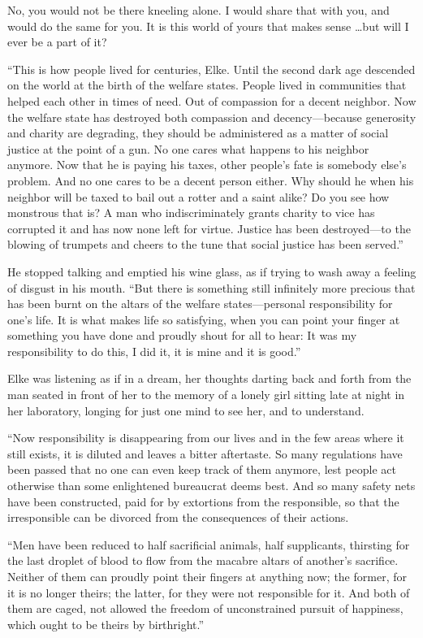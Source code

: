 No, you would not be there kneeling alone. I would share that with you, and would do the same for you. It is this world of yours that makes sense \ldots but will I ever be a part of it?

``This is how people lived for centuries, Elke. Until the second dark age descended on the world at the birth of the welfare states. People lived in communities that helped each other in times of need. Out of compassion for a decent neighbor. Now the welfare state has destroyed both compassion and decency---because generosity and charity are degrading, they should be administered as a matter of social justice at the point of a gun. No one cares what happens to his neighbor anymore. Now that he is paying his taxes, other people's fate is somebody else's problem. And no one cares to be a decent person either. Why should he when his neighbor will be taxed to bail out a rotter and a saint alike? Do you see how monstrous that is? A man who indiscriminately grants charity to vice has corrupted it and has now none left for virtue. Justice has been destroyed---to the blowing of trumpets and cheers to the tune that social justice has been served.''

He stopped talking and emptied his wine glass, as if trying to wash away a feeling of disgust in his mouth. ``But there is something still infinitely more precious that has been burnt on the altars of the welfare states---personal responsibility for one's life. It is what makes life so satisfying, when you can point your finger at something you have done and proudly shout for all to hear: It was my responsibility to do this, I did it, it is mine and it is good.''

Elke was listening as if in a dream, her thoughts darting back and forth from the man seated in front of her to the memory of a lonely girl sitting late at night in her laboratory, longing for just one mind to see her, and to understand.

``Now responsibility is disappearing from our lives and in the few areas where it still exists, it is diluted and leaves a bitter aftertaste. So many regulations have been passed that no one can even keep track of them anymore, lest people act otherwise than some enlightened bureaucrat deems best. And so many safety nets have been constructed, paid for by extortions from the responsible, so that the irresponsible can be divorced from the consequences of their actions.

``Men have been reduced to half sacrificial animals, half supplicants, thirsting for the last droplet of blood to flow from the macabre altars of another's sacrifice. Neither of them can proudly point their fingers at anything now; the former, for it is no longer theirs; the latter, for they were not responsible for it. And both of them are caged, not allowed the freedom of unconstrained pursuit of happiness, which ought to be theirs by birthright.''

